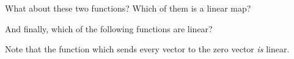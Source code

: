 \documentclass{ximera}
\begin{document}
\begin{question}
\begin{solution}
\begin{multiple-choice}
    \end{multiple-choice}
  \end{solution}

  What about these two functions?  Which of them is a linear map?
  \begin{solution}
    \begin{multiple-choice}
    \end{multiple-choice}
  \end{solution}

  And finally, which of the following functions are linear?
  \begin{solution}
    \begin{multiple-choice}
    \end{multiple-choice}
  \end{solution}

  \begin{warning}
    Note that the function which sends every vector to the zero vector
    \textit{is} linear.
  \end{warning}
\end{question}
	
\end{document}
